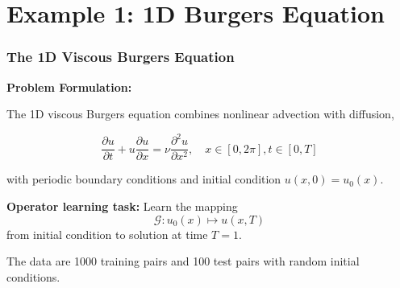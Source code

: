 \documentclass{beamer}
\begin{document}
\section{Example 1: 1D Burgers Equation}

\begin{frame}
\frametitle{The 1D Viscous Burgers Equation}

\textbf{Problem Formulation:}

The 1D viscous Burgers equation combines nonlinear advection with diffusion,

\begin{equation*}
\frac{\partial u}{\partial t} + u\frac{\partial u}{\partial x} = \nu \frac{\partial^2 u}{\partial x^2}, \quad x \in [0, 2\pi], t \in [0, T]
\end{equation*}

with periodic boundary conditions and initial condition $u(x, 0) = u_0(x)$.

\vspace{0.3cm}

\textbf{Operator learning task:} Learn the mapping
\begin{equation*}
\mathcal{G}: u_0(x) \mapsto u(x, T)
\end{equation*}
from initial condition to solution at time $T = 1$.

\vspace{0.2cm}

The data are 1000 training pairs and 100 test pairs with random initial conditions.

\end{frame}
\end{document}
